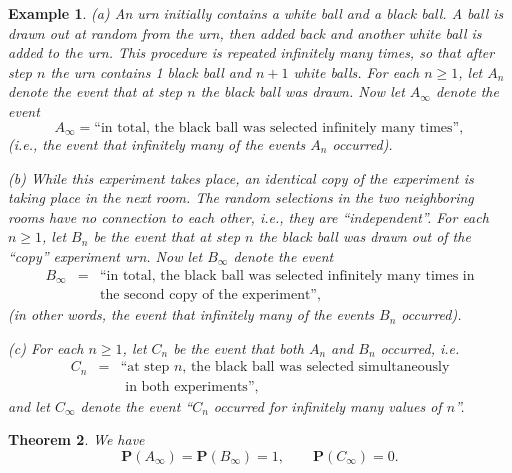 \documentclass[12pt]{article}
\newtheorem{thm}{Theorem}[section]
\newcommand{\prob}{\mathbf{P}}
\theoremstyle{example}
\newtheorem{example}[thm]{Example}
\begin{document}
\begin{example}
(a) An urn initially contains a white ball and a black ball. A ball is drawn out at random from the urn, then added back and another white ball is added to the urn. This procedure is repeated infinitely many times, so that after step $n$ the urn contains 1 black ball and $n+1$ white balls. For each $n\ge1$, let $A_n$ denote the event that at step $n$ the black ball was drawn. Now let $A_\infty$ denote the event
$$ A_\infty = \textrm{``in total, the black ball was selected infinitely many times''}, $$
(i.e., the event that infinitely many of the events $A_n$ occurred).

\medskip\noindent
(b) While this experiment takes place, an identical copy of the experiment is taking place in the next room. The random selections in the two neighboring rooms have no connection to each other, i.e., they are ``independent''. For each $n\ge 1$, let $B_n$ be the event
that at step $n$ the black ball was drawn out of the ``copy'' experiment urn. Now let $B_\infty$ denote the event
\begin{eqnarray*}
B_\infty &=& \textrm{``in total, the black ball was selected infinitely many times in}\\&&
\textrm{the second copy of the experiment''},
\end{eqnarray*}
(in other words, the event that infinitely many of the events $B_n$ occurred).

\medskip\noindent
(c) For each $n\ge 1$, let $C_n$ be the event that both $A_n$ and $B_n$ occurred, i.e.
\begin{eqnarray*}
C_n &=& \textrm{``at step $n$, the black ball was selected simultaneously}
\\ & & \textrm{ in both experiments'',}
\end{eqnarray*}
and let $C_\infty$ denote the event ``$C_n$ occurred for infinitely many values of $n$''.
\end{example}

\begin{thm}
We have
$$ \prob(A_\infty) = \prob(B_\infty) = 1, \qquad \prob(C_\infty) = 0. $$
\end{thm}
\end{document}

